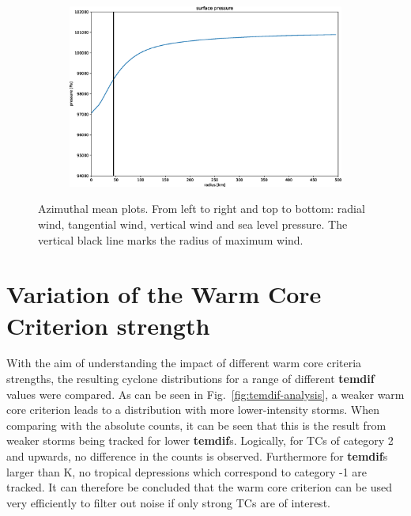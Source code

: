 \begin{figure}[ht]
\begin{subfigure}{.5\linewidth}
	\end{subfigure}%
	\begin{subfigure}{.5\linewidth}
		\centering
		\includegraphics[width=0.75\linewidth]{img/tight09279566pres_msl20130706T120000Z.eps}
	\end{subfigure}
	\caption[short]{Azimuthal mean plots. From left to right and top to bottom: radial wind, tangential wind, vertical wind and sea level pressure. The vertical black line marks the radius of maximum wind.}
	\label{fig:azimean}
\end{figure}


\section{Variation of the Warm Core Criterion strength}
With the aim of understanding the impact of different warm core criteria strengths, the resulting cyclone distributions for a range of different \textbf{temdif} values were compared. As can be seen in Fig.~\ref{fig:temdif-analysis}, a weaker warm core criterion leads to a distribution with more lower-intensity storms. When comparing with the absolute counts, it can be seen that this is the result from weaker storms being tracked for lower \textbf{temdif}s. Logically, for TCs of category 2 and upwards, no difference in the counts is observed. Furthermore for \textbf{temdif}s larger than \unit[1]{K}, no tropical depressions which correspond to category -1 are tracked. It can therefore be concluded that the warm core criterion can be used very efficiently to filter out noise if only strong TCs are of interest.

